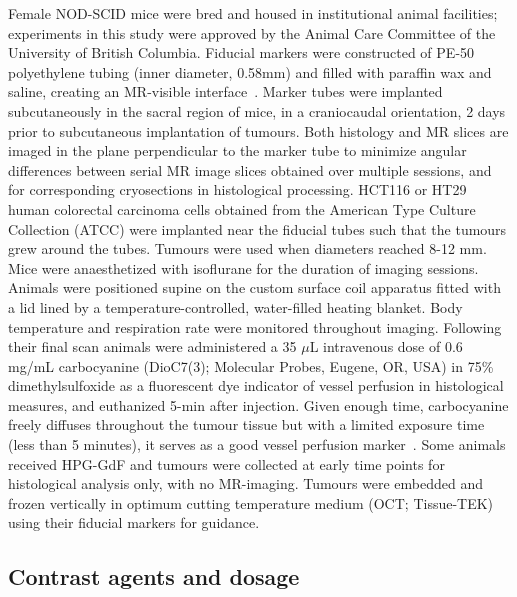 Female NOD-SCID mice were bred and housed in institutional animal facilities; experiments in this study were approved by the Animal Care Committee of the University of British Columbia.
Fiducial markers were constructed of PE-50 polyethylene tubing (inner diameter, 0.58mm) and filled with paraffin wax and saline, creating an MR-visible interface~\cite{Bains:2009hh}.
Marker tubes were implanted subcutaneously in the sacral region of mice, in a craniocaudal orientation, 2 days prior to subcutaneous implantation of tumours.
Both histology and MR slices are imaged in the plane perpendicular to the marker tube to minimize angular differences between serial MR image slices obtained over multiple sessions, and for corresponding cryosections in histological processing.
HCT116 or HT29 human colorectal carcinoma cells obtained from the American Type Culture Collection (ATCC) were implanted near the fiducial tubes such that the tumours grew around the tubes.
Tumours were used when diameters reached 8-12 mm.
Mice were anaesthetized with isoflurane for the duration of imaging sessions.
Animals were positioned supine on the custom surface coil apparatus fitted with a lid lined by a temperature-controlled, water-filled heating blanket.
Body temperature and respiration rate were monitored throughout imaging.
Following their final scan animals were administered a 35 $\mu$L intravenous dose of 0.6 mg/mL carbocyanine (DioC7(3); Molecular Probes, Eugene, OR, USA) in 75\% dimethylsulfoxide as a fluorescent dye indicator of vessel perfusion in histological measures, and euthanized 5-min after injection.
Given enough time, carbocyanine freely diffuses throughout the tumour tissue but with a limited exposure time (less than 5 minutes), it serves as a good vessel perfusion marker~\cite{Trotter:1989cs}.  
Some animals received \acs{HPG-GdF} and tumours were collected at early time points for histological analysis only, with no MR-imaging.
Tumours were embedded and frozen vertically in optimum cutting temperature medium (OCT; Tissue-TEK) using their fiducial markers for guidance.

\subsection{Contrast agents and dosage}

